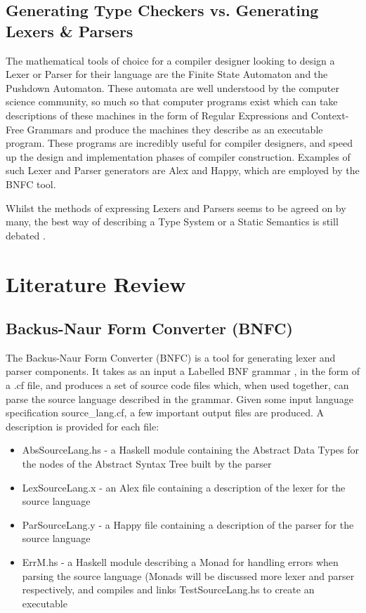 \documentclass{UoYCSproject}
\begin{document}
\section{Generating Type Checkers vs. Generating Lexers \& Parsers}
The mathematical tools of choice for a compiler designer looking to design
a Lexer or Parser for their language are the Finite State Automaton and the
Pushdown Automaton. These automata are well understood by the computer science
community, so much so that computer programs exist which can take descriptions
of these machines in the form of Regular Expressions and Context-Free Grammars
and produce the machines they describe as an executable program. These programs
are incredibly useful for compiler designers, and speed up the design and
implementation phases of compiler construction. Examples of such Lexer and Parser
generators are Alex and Happy, which are employed by the BNFC tool.

Whilst the methods of expressing Lexers and Parsers seems to be agreed on by
many, the best way of describing a Type System or a Static Semantics is still
debated \cite{NeilJones}.

\chapter{Literature Review}

\section{Backus-Naur Form Converter (BNFC)}
\label{sec:BNFC}

The Backus-Naur Form Converter (BNFC) is a tool for generating lexer and parser
components. It takes as an input a Labelled BNF grammar \cite{LBNFReport},
in the form of a {\ttfamily .cf} file, and produces a set of source code files
which, when used together, can parse the source language described in the
grammar. Given some input language specification {\ttfamily source\_lang.cf},
a few important output files are produced. A description is provided for each
file:
\begin{itemize}
    \item {\ttfamily AbsSourceLang.hs} - a Haskell module containing the Abstract
        Data Types for the nodes of the Abstract Syntax Tree built by the
        parser
    \item {\ttfamily LexSourceLang.x} - an Alex file containing a description
        of the lexer for the source language
    \item {\ttfamily ParSourceLang.y} - a Happy file containing a description
        of the parser for the source language
    \item {\ttfamily ErrM.hs} - a Haskell module describing a Monad for handling
        errors when parsing the source language (Monads will be discussed more
        lexer and parser respectively, and compiles and links TestSourceLang.hs
        to create an executable
\end{itemize}
\end{document}

